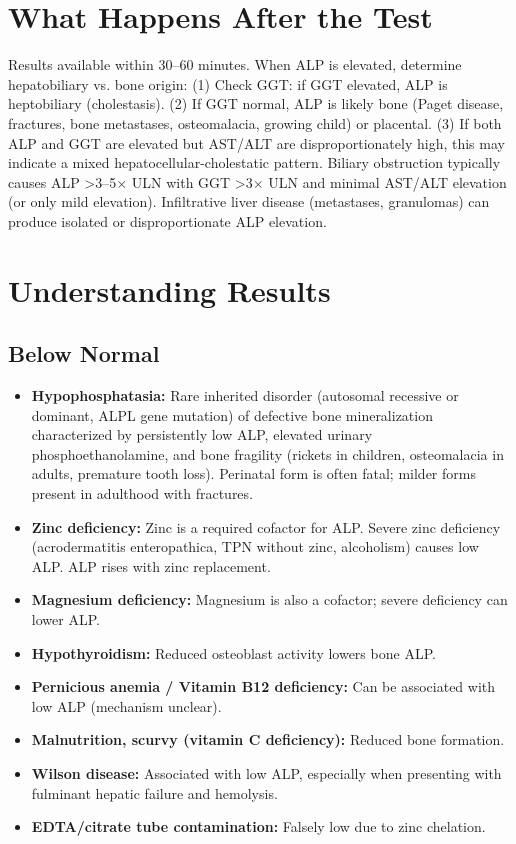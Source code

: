 \section*{What Happens After the Test}
Results available within 30--60 minutes. When ALP is elevated, determine hepatobiliary vs. bone origin: (1) Check GGT: if GGT elevated, ALP is heptobiliary (cholestasis). (2) If GGT normal, ALP is likely bone (Paget disease, fractures, bone metastases, osteomalacia, growing child) or placental. (3) If both ALP and GGT are elevated but AST/ALT are disproportionately high, this may indicate a mixed hepatocellular-cholestatic pattern. Biliary obstruction typically causes ALP >3--5$\times$ ULN with GGT >3$\times$ ULN and minimal AST/ALT elevation (or only mild elevation). Infiltrative liver disease (metastases, granulomas) can produce isolated or disproportionate ALP elevation.

\section*{Understanding Results}

\subsection*{Below Normal}
\begin{itemize}
  \item \textbf{Hypophosphatasia:} Rare inherited disorder (autosomal recessive or dominant, ALPL gene mutation) of defective bone mineralization characterized by persistently low ALP, elevated urinary phosphoethanolamine, and bone fragility (rickets in children, osteomalacia in adults, premature tooth loss). Perinatal form is often fatal; milder forms present in adulthood with fractures.
  \item \textbf{Zinc deficiency:} Zinc is a required cofactor for ALP. Severe zinc deficiency (acrodermatitis enteropathica, TPN without zinc, alcoholism) causes low ALP. ALP rises with zinc replacement.
  \item \textbf{Magnesium deficiency:} Magnesium is also a cofactor; severe deficiency can lower ALP.
  \item \textbf{Hypothyroidism:} Reduced osteoblast activity lowers bone ALP.
  \item \textbf{Pernicious anemia / Vitamin B12 deficiency:} Can be associated with low ALP (mechanism unclear).
  \item \textbf{Malnutrition, scurvy (vitamin C deficiency):} Reduced bone formation.
  \item \textbf{Wilson disease:} Associated with low ALP, especially when presenting with fulminant hepatic failure and hemolysis.
  \item \textbf{EDTA/citrate tube contamination:} Falsely low due to zinc chelation.
\end{itemize}

